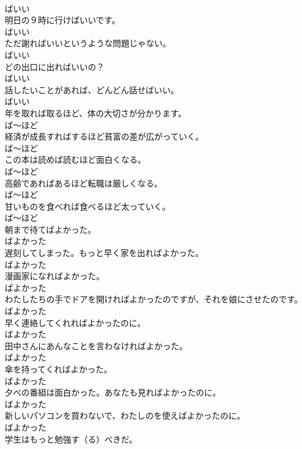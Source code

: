 \documentclass[8pt]{extreport}
\begin{document}
\begin{CJK}{UTF8}{min}
\\	ばいい
\\	明日の９時に行けばいいです。	
\\	ばいい
\\	ただ謝ればいいというような問題じゃない。	
\\	ばいい
\\	どの出口に出ればいいの？	
\\	ばいい
\\	話したいことがあれば、どんどん話せばいい。	
\\	ばいい
\\	年を取れば取るほど、体の大切さが分かります。	
\\	ば～ほど
\\	経済が成長すればするほど貧富の差が広がっていく。	
\\	ば～ほど
\\	この本は読めば読むほど面白くなる。	
\\	ば～ほど
\\	高齢であればあるほど転職は厳しくなる。	
\\	ば～ほど
\\	甘いものを食べれば食べるほど太っていく。	
\\	ば～ほど
\\	朝まで待てばよかった。	
\\	ばよかった
\\	遅刻してしまった。もっと早く家を出ればよかった。	
\\	ばよかった
\\	漫画家になればよかった。	
\\	ばよかった
\\	わたしたちの手でドアを開ければよかったのですが、それを娘にさせたのです。	
\\	ばよかった
\\	早く連絡してくれればよかったのに。	
\\	ばよかった
\\	田中さんにあんなことを言わなければよかった。	
\\	ばよかった
\\	傘を持ってくればよかった。	
\\	ばよかった
\\	夕べの番組は面白かった。あなたも見ればよかったのに。	
\\	ばよかった
\\	新しいパソコンを買わないで、わたしのを使えばよかったのに。	
\\	ばよかった
\\	学生はもっと勉強す（る）べきだ。	

\end{CJK}
\end{document}
